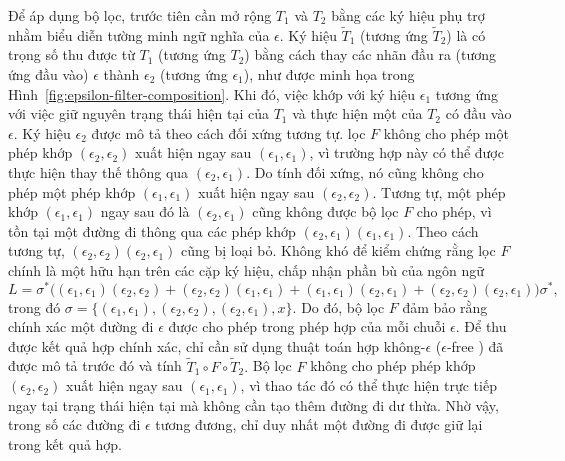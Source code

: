 Để áp dụng bộ lọc,
trước tiên cần mở rộng $T_1$ và $T_2$
bằng các ký hiệu phụ trợ
nhằm biểu diễn tường minh
ngữ nghĩa của $\epsilon$.
Ký hiệu $\tilde{T}_1$
(tương ứng $\tilde{T}_2$)
là  có trọng số
thu được từ $T_1$
(tương ứng $T_2$)
bằng cách thay các nhãn đầu ra
(tương ứng đầu vào)
$\epsilon$
thành $\epsilon_2$
(tương ứng $\epsilon_1$),
như được minh họa trong Hình~\ref{fig:epsilon-filter-composition}.
Khi đó,
việc khớp với ký hiệu $\epsilon_1$
tương ứng với việc giữ nguyên
trạng thái hiện tại của $T_1$
và thực hiện một  của $T_2$
có đầu vào $\epsilon$.
Ký hiệu $\epsilon_2$
được mô tả theo cách đối xứng tương tự.  lọc $F$
không cho phép một phép khớp
$(\epsilon_2, \epsilon_2)$
xuất hiện ngay sau
$(\epsilon_1, \epsilon_1)$,
vì trường hợp này có thể được thực hiện thay thế
thông qua $(\epsilon_2, \epsilon_1)$.
Do tính đối xứng,
nó cũng không cho phép
một phép khớp
$(\epsilon_1, \epsilon_1)$
xuất hiện ngay sau
$(\epsilon_2, \epsilon_2)$.
Tương tự,
một phép khớp
$(\epsilon_1, \epsilon_1)$
ngay sau đó là
$(\epsilon_2, \epsilon_1)$
cũng không được bộ lọc $F$ cho phép,
vì tồn tại một đường đi
thông qua các phép khớp
$(\epsilon_2, \epsilon_1)(\epsilon_1, \epsilon_1)$.
Theo cách tương tự,
$(\epsilon_2, \epsilon_2)(\epsilon_2, \epsilon_1)$
cũng bị loại bỏ.
Không khó để kiểm chứng rằng
 lọc $F$
chính là một  hữu hạn
trên các cặp ký hiệu,
chấp nhận phần bù của ngôn ngữ
\begin{equation}
L = \sigma^*
\big(
(\epsilon_1,\epsilon_1)(\epsilon_2,\epsilon_2)
+
(\epsilon_2,\epsilon_2)(\epsilon_1,\epsilon_1)
+
(\epsilon_1,\epsilon_1)(\epsilon_2,\epsilon_1)
+
(\epsilon_2,\epsilon_2)(\epsilon_2,\epsilon_1)
\big)
\sigma^*
,
\end{equation}
trong đó
$
\sigma =
\{
(\epsilon_1,\epsilon_1),
(\epsilon_2,\epsilon_2),
(\epsilon_2,\epsilon_1),
x
\}.
$
Do đó,
bộ lọc $F$
đảm bảo rằng
chính xác một đường đi $\epsilon$
được cho phép
trong phép hợp
của mỗi chuỗi $\epsilon$.
Để thu được kết quả hợp chính xác,
chỉ cần sử dụng thuật toán hợp không-$\epsilon$ ($\epsilon$-free )
đã được mô tả trước đó
và tính
$
\tilde{T}_1 \circ F \circ \tilde{T}_2.
$
Bộ lọc $F$
không cho phép phép khớp
$(\epsilon_2,\epsilon_2)$
xuất hiện ngay sau
$(\epsilon_1,\epsilon_1)$,
vì thao tác đó có thể thực hiện trực tiếp
ngay tại trạng thái hiện tại
mà không cần tạo thêm
đường đi dư thừa.
Nhờ vậy,
trong số các đường đi $\epsilon$
tương đương,
chỉ duy nhất một đường đi
được giữ lại
trong kết quả hợp.

